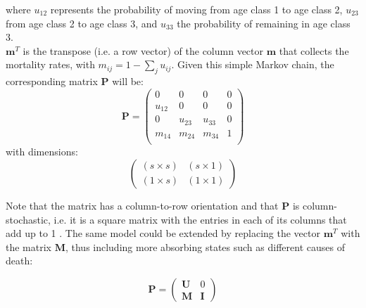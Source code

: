 \documentclass[\main/main.tex]{subfiles}
\begin{document}
where $ u_{12}$ represents the probability of moving from age class 1 to age class 2, $ u_{23}$ from age class 2 to age class 3, and $ u_{33}$ the probability of remaining in age class 3.\\
$ \mathbf{m}^T$ is the transpose (i.e. a row vector) of the column vector $\mathbf{m}$ that collects the mortality rates, with $m_{ij} = 1 - \sum_{j} u_{ij}$. 
Given this simple Markov chain, the corresponding matrix $\mathbf{P}$ will be:
\begin{equation}
    \mathbf{P}= \begin{pmatrix}
    0 & 0 & 0 & 0\\
    u_{12} & 0 & 0& 0\\
0 & u_{23} & u_{33}& 0\\
m_{14} & m_{24} & m_{34}& 1\\
    \end{pmatrix}
\end{equation}
with dimensions:
\begin{equation}
\begin{pmatrix}
    (s \times s) &  (s \times 1)\\
    (1 \times s) & (1 \times 1)
\end{pmatrix}
\end{equation}

\noindent Note that the matrix has a column-to-row orientation and that $\mathbf{P}$ is column-stochastic, i.e. it is a square matrix with the entries in each of its columns that add up to 1 \citep{Poole1995}. 
The same model could be extended by replacing the vector $\mathbf{m}^T$ with the matrix $\mathbf{M}$, thus including more absorbing states such as different causes of death:

\begin{equation}\label{matrixmodel}
    \mathbf{P} = \begin{pmatrix}
        \mathbf{U} &  0\\
    \mathbf{M}& \mathbf{I}
    \end{pmatrix}
\end{equation}
\end{document}
